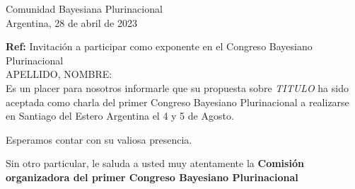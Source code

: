 \documentclass[a4paper,11pt]{article}
\begin{document}
\begin{flushright}
Comunidad Bayesiana Plurinacional \\
Argentina, 28 de abril de 2023
\end{flushright} 

\vspace{0.1cm}
\noindent

\hfill \textbf{Ref:} Invitación a participar como exponente en el Congreso Bayesiano Plurinacional \\

\noindent APELLIDO, NOMBRE:\\

\indent Es un placer para nosotros informarle que su propuesta sobre \emph{TITULO} ha sido aceptada como charla del primer Congreso Bayesiano Plurinacional a realizarse en Santiago del Estero Argentina el 4 y 5 de Agosto.

\vspace{0.3cm}

\indent Esperamos contar con su valiosa presencia.

\vspace{0.3cm}

\indent  Sin otro particular, le saluda a usted muy atentamente la \textbf{Comisión organizadora del primer Congreso Bayesiano Plurinacional}\\
\end{document}
